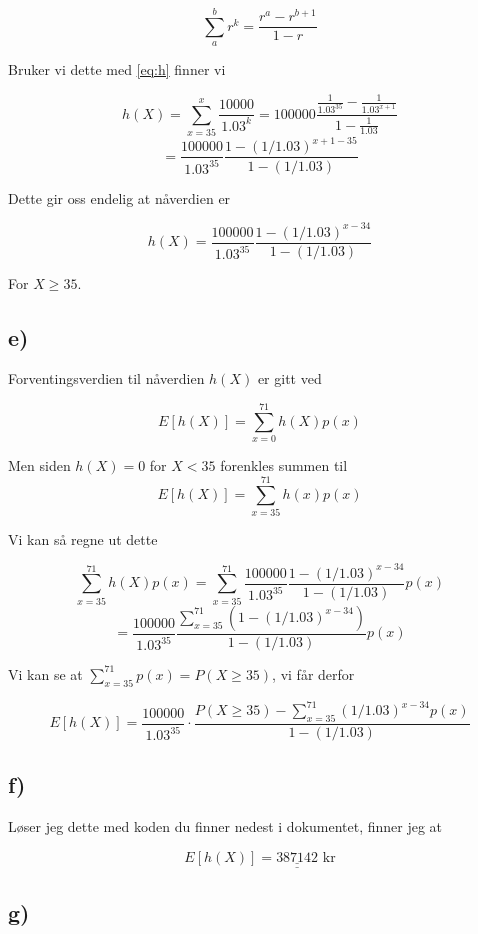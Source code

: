 \documentclass[a4paper,norsk, 10pt]{article}
\begin{document}
$$
\sum_a^b r^k = \frac{r^a - r^{b+1}}{1-r}
$$

Bruker vi dette med \eqref{eq:h} finner vi

$$
h(X)  = \sum_{x = 35}^{x}\frac{10000}{1.03^k} = 100000 \frac{\frac{1}{1.03^{35}} - \frac{1}{1.03^{x+1}}}{1 - \frac{1}{1.03}}
$$
$$
= \frac{100000}{1.03^{35}}\frac{1-(1/1.03)^{x+1-35}}{1 - (1/1.03)}
$$

Dette gir oss endelig at nåverdien er

\begin{equation}
h(X) = \frac{100000}{1.03^{35}}\frac{1-(1/1.03)^{x-34}}{1 - (1/1.03)}
\label{eq:nåverdi}
\end{equation}

For $X\geq 35$.

\subsection*{e)}

Forventingsverdien til nåverdien $h(X)$ er gitt ved

$$
E[h(X)] = \sum_{x = 0}^{71}h(X)p(x)
$$

Men siden $h(X) = 0$ for $X<35$ forenkles summen til
$$
E[h(X)] = \sum_{x = 35}^{71}h(x)p(x)
$$

Vi kan så regne ut dette 

$$
\sum_{x = 35}^{71}h(X)p(x) = \sum_{x = 35}^{71}\frac{100000}{1.03^{35}}\frac{1-(1/1.03)^{x-34}}{1 - (1/1.03)} p(x)
$$
$$
= \frac{100000}{1.03^{35}}\frac{\sum_{x = 35}^{71}\left(1 - (1/1.03)^{x-34}\right)}{1-(1/1.03)} p(x)
$$

Vi kan se at $\sum_{x = 35}^{71} p(x) = P(X\geq 35)$, vi får derfor

\begin{equation}
E[h(X)] = \frac{100000}{1.03^{35}}\cdot\frac{P(X\geq 35) - \sum_{x = 35}^{71}(1/1.03)^{x-34}p(x)}{1-(1/1.03)} 
\end{equation}

\subsection*{f)}

Løser jeg dette med koden du finner nedest i dokumentet, finner jeg at

$$
E[h(X)] = \underline{\underline{387142}} \text{ kr}
$$

\subsection*{g)}
\end{document}
